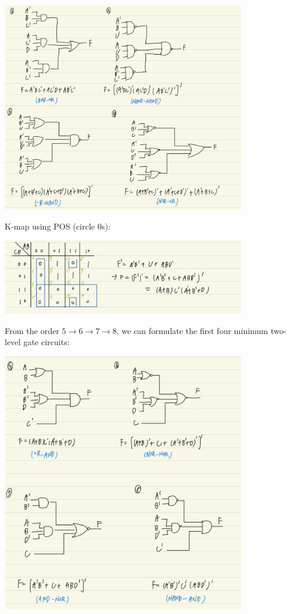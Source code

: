 \documentclass{article}
\begin{document}
\begin{center}
    \includegraphics[width=0.8\textwidth]{HW2_6_SOP_gate}
\end{center}

K-map using POS (circle $0$s):

\begin{center}
    \includegraphics[width=0.8\textwidth]{HW2_6_POS_KMap}
\end{center}

From the order $5 \rightarrow 6 \rightarrow 7 \rightarrow 8$, we can formulate the first four minimum two-level gate circuits:

\begin{center}
    \includegraphics[width=0.8\textwidth]{HW2_6_POS_gate}
\end{center}
\end{document}
